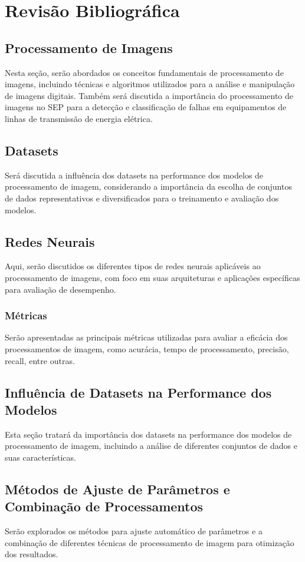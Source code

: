 \chapter{Revisão Bibliográfica}
\section{Processamento de Imagens}
Nesta seção, serão abordados os conceitos fundamentais de processamento de imagens, incluindo técnicas e algoritmos utilizados para a análise e manipulação de imagens digitais. Também será discutida a importância do processamento de imagens no SEP para a detecção e classificação de falhas em equipamentos de linhas de transmissão de energia elétrica.

\section{Datasets}
Será discutida a influência dos datasets na performance dos modelos de processamento de imagem, considerando a importância da escolha de conjuntos de dados representativos e diversificados para o treinamento e avaliação dos modelos.

\section{Redes Neurais}
Aqui, serão discutidos os diferentes tipos de redes neurais aplicáveis ao processamento de imagens, com foco em suas arquiteturas e aplicações específicas para avaliação de desempenho.

\subsection{Métricas}
Serão apresentadas as principais métricas utilizadas para avaliar a eficácia dos processamentos de imagem, como acurácia, tempo de processamento, precisão, recall, entre outras.

\section{Influência de Datasets na Performance dos Modelos}
Esta seção tratará da importância dos datasets na performance dos modelos de processamento de imagem, incluindo a análise de diferentes conjuntos de dados e suas características.

\section{Métodos de Ajuste de Parâmetros e Combinação de Processamentos}
Serão explorados os métodos para ajuste automático de parâmetros e a combinação de diferentes técnicas de processamento de imagem para otimização dos resultados.
